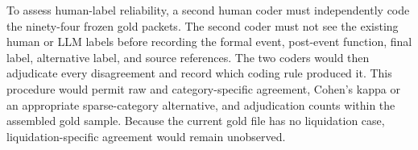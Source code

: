 To assess human-label reliability, a second human coder must independently
code the ninety-four frozen gold packets. The second coder must not see the
existing human or LLM labels before recording the formal event, post-event
function, final label, alternative label, and source references. The two
coders would then adjudicate every disagreement and record which coding rule
produced it. This procedure would permit raw and category-specific agreement,
Cohen's kappa or an appropriate sparse-category alternative, and adjudication
counts within the assembled gold sample. Because the current gold file has no
liquidation case, liquidation-specific agreement would remain unobserved.
